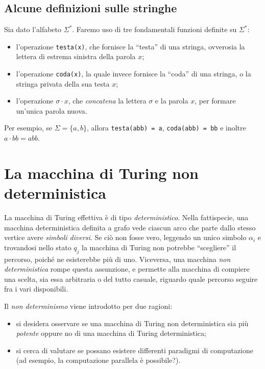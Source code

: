 \documentclass[10pt]{\classname}
\begin{document}
\subsection{Alcune definizioni sulle stringhe}

Sia dato l'alfabeto $\Sigma^*$. Faremo uso di tre fondamentali funzioni
definite su $\Sigma^*$:
\begin{itemize}
    \item l'operazione \texttt{testa(x)}, che fornisce la ``testa'' di una stringa,
        ovverosia la lettera di estrema sinistra della parola $x$;
    \item l'operazione \texttt{coda(x)}, la quale invece fornisce la ``coda'' di una
        stringa, o la stringa privata della sua testa $x$;
    \item l'operazione $\sigma \cdot x$, che \emph{concatena} la lettera
        $\sigma$ e la parola $x$, per formare un'unica parola nuova.
\end{itemize}

Per esempio, se $\Sigma = \{a, b\}$, allora \texttt{testa(abb) = a}, \texttt{coda(abb) = bb} e inoltre $a \cdot bb = abb$.


\section{La macchina di Turing non deterministica}

La macchina di Turing effettiva è di tipo \emph{deterministico}. Nella
fattispecie, una macchina deterministica definita a grafo vede ciascun arco che
parte dallo stesso vertice avere \emph{simboli diversi}. Se ciò non fosse vero,
leggendo un unico simbolo $\alpha_i$ e trovandosi nello stato $q_j$ la macchina
di Turing non potrebbe ``scegliere'' il percorso, poiché ne esisterebbe più di
uno. Viceversa, una macchina \emph{non deterministica} rompe questa assunzione,
e permette alla macchina di compiere una scelta, sia essa arbitraria o del
tutto casuale, riguardo quale percorso seguire fra i vari disponibili. 

Il \emph{non determinismo} viene introdotto per due ragioni:
\begin{itemize}
    \item si desidera osservare se una macchina di Turing non deterministica
        sia più \emph{potente} oppure no di una macchina di Turing deterministica;
    \item si cerca di valutare se possano esistere differenti paradigmi di
        computazione (ad esempio, la computazione parallela è possibile?).
\end{itemize}
\end{document}
